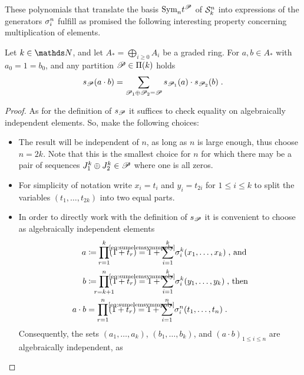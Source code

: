 These polynomials that translate the basis $\text{\normalfont Sym}_{n}t^{\mathscr{P}}$ of
$\mathcal{S}^{n}_k$ into expressions of the generators $\sigma_{i}^{n}$
fulfill as promised the following interesting property concerning
multiplication of elements.
\begin{Lem}\label{lem:productrule:general}
  Let $k\in\Nat$, and let $A_*=\bigoplus_{i\geq 0} A_i$ be a graded ring.
  For $a,b\in A_*$ with $a_0=1=b_0$, and any partition
  $\mathscr{P}\in\Pi({k})$ holds
  \begin{gather*}
    s_{\mathscr{P}}(a\cdot b)
    = \sum_{\mathscr{P}_1\oplus\mathscr{P}_2=\mathscr{P}}
    s_{\mathscr{P}_1}(a) \cdot s_{\mathscr{P}_2}(b)
    \;.
  \end{gather*}
  \begin{proof}
    As for the definition of $s_{\mathscr{P}}$ it suffices to check equality
    on algebraically independent elements. So, make the following choices:
    \begin{itemize}
    \item The result will be independent of $n$, as long as
      $n$ is large enough, thus choose $n=2k$.
      Note that this is the smallest choice for $n$ for which there
      may be a pair of sequences $J_1^k\oplus J_2^k\in\mathscr{P}$
      where one is all zeros.
    \item For simplicity of notation write
      $x_i=t_i$ and $y_i=t_{2i}$ for $1\leq i\leq k$ to split the
      variables $(t_1,\dotsc,t_{2k})$ into two equal parts.
    \item In order to directly work with the definition of $s_{\mathscr{P}}$ it is
      convenient to choose as algebraically independent elements
      \begin{align*}
        a &\coloneqq
            \prod_{\mathclap{r=1}}^k(1+t_r)
            \cequalsby{\eqref{eq:sumelemsymmpoly}}
            1 + \sum_{i=1}^k \el i k(x_1,\dotsc,x_k)
            \;\text{, and}\\
        b &\coloneqq
            \prod_{\mathclap{r=k+1}}^n(1+t_r)
            \cequalsby{\eqref{eq:sumelemsymmpoly}}
            1 + \sum_{i=1}^k \el i k(y_1,\dotsc,y_k)
            \;\text{, then}\\
        a\cdot b
          &=
            \prod_{r=1}^n (1+t_r)
            \cequalsby{\eqref{eq:sumelemsymmpoly}}
            1 + \sum_{i=1}^n \el i n (t_1,\dotsc,t_n)
            \;.
      \end{align*}
      Consequently, the sets 
      $(a_1,\dotsc,a_k)$, $(b_1,\dotsc,b_k)$, and
      $(a\cdot b)_{1\leq i\leq n}$ are algebraically independent, as

\end{itemize}
\end{proof}
\end{Lem}
